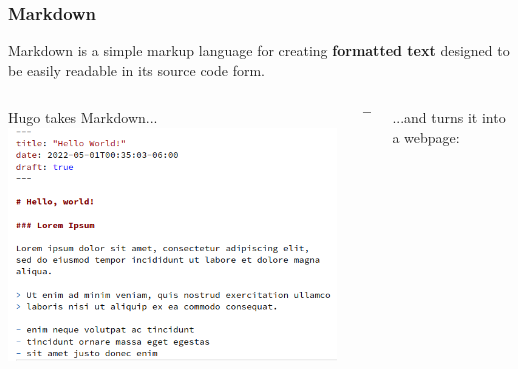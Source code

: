 \begin{frame}
    \frametitle{Markdown}

    Markdown is a simple markup language for creating \textbf{formatted text} designed to be easily readable in
    its source code form.
    \bigskip

    \pause
    \begin{columns}
        \begin{column}{.45\textwidth}
            Hugo takes Markdown... \ \\
            \bigskip
            \includegraphics[width=\textwidth]{images/markdown.png}
        \end{column}
        \pause
        \begin{column}{.1\textwidth}
            $$ \to $$
        \end{column}
        \begin{column}{.45\textwidth}
            ...and turns it into a webpage: \ \\
            \bigskip

\end{column}
\end{columns}
\end{frame}
